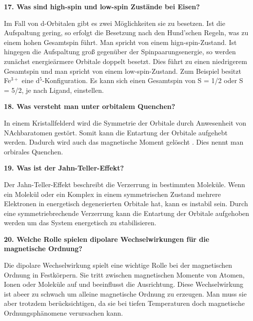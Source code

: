\noindent\textbf{17. Was sind high-spin und low-spin Zustände bei Eisen?}\\
\begin{addmargin}[25pt]{0pt}
Im Fall von d-Orbitalen gibt es zwei Möglichkeiten sie zu besetzen. Ist die Aufspaltung gering, so erfolgt die Besetzung nach den Hund'schen Regeln, was zu einem hohen Gesamtspin führt. Man spricht von einem hign-spin-Zustand. Ist hingegen die Aufspaltung groß gegenüber der Spinpaarungsenergie, so werden zunächst energieärmere Orbitale doppelt besetzt. Dies führt zu einen niedrigerem Gesamtspin und man spricht von einem low-spin-Zustand. Zum Beispiel besitzt Fe$^{3+}$ eine d$^{5}$-Konfiguration. Es kann sich einen Gesamtspin von S = 1/2 oder S = 5/2, je nach Ligand, einstellen.\\
\end{addmargin}

\noindent\textbf{18. Was versteht man unter \glqq orbitalem Quenchen\grqq ?}\\
\begin{addmargin}[25pt]{0pt}
In einem Kristallfelderd wird die Symmetrie der Orbitale durch Anwesenheit von NAchbaratomen gestört. Somit kann die Entartung der Orbitale aufgehebt werden. Dadurch wird auch das magnetische Moment \glqq gelöscht \grqq. Dies nennt man orbirales Quenchen.\\
\end{addmargin}

\noindent\textbf{19. Was ist der Jahn-Teller-Effekt?}\\
\begin{addmargin}[25pt]{0pt}
Der Jahn-Teller-Effekt beschreibt die Verzerrung in bestimmten Moleküle. Wenn ein Molekül oder ein Komplex in einem symmetrischen Zustand mehrere Elektronen in energetisch degenerierten Orbitale hat, kann es instabil sein. Durch eine symmetriebrechende Verzerrung kann die Entartung der Orbitale aufgehoben werden um das System energetisch zu stabilisieren.\\
\end{addmargin}

\noindent\textbf{20. Welche Rolle spielen dipolare Wechselwirkungen für die magnetische Ordnung?}\\
\begin{addmargin}[25pt]{0pt}
Die dipolare Wechselwirkung spielt eine wichtige Rolle bei der magnetischen Ordnung in Festkörpern. Sie tritt zwischen magnetischen Momente von Atomen, Ionen oder Moleküle auf und beeinflusst die Ausrichtung. Diese Wechselwirkung ist abeer zu schwach um alleine magnetische Ordnung zu erzeugen. Man muss sie aber trotzdem berücksichtigen, da sie bei tiefen Temperaturen doch magnetische Ordnungsphänomene verursachen kann.\\
\end{addmargin}

